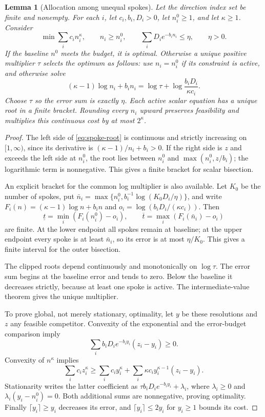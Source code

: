 \documentclass[11pt,letterpaper]{article}
\newtheorem{lemma}{Lemma}[section]
\theoremstyle{definition}
\theoremstyle{remark}
\begin{document}
\begin{lemma}[Allocation among unequal spokes]\label{thm:spokes}
Let the direction index set be finite and nonempty.
For each \(i\), let \(c_i,b_i,D_i>0\), let \(n_i^0\ge1\), and let \(\kappa\ge1\).
Consider
\[
 \min\sum_i c_i n_i^\kappa,\qquad
 n_i\ge n_i^0,\qquad \sum_iD_ie^{-b_in_i}\le\eta,\qquad\eta>0.
\]
If the baseline \(n^0\) meets the budget, it is optimal.
Otherwise a unique positive multiplier \(\tau\) selects the optimum as follows:
use \(n_i=n_i^0\) if its constraint is active, and otherwise solve
\begin{equation}\label{eq:spoke-root}
 (\kappa-1)\log n_i+b_in_i
       =\log\tau+\log\frac{b_iD_i}{\kappa c_i}.
\end{equation}
Choose \(\tau\) so the error sum is exactly \(\eta\).
Each active scalar equation has a unique root in a finite bracket.
Rounding every \(n_i\) upward preserves feasibility and multiplies this
continuous cost by at most \(2^\kappa\).
\end{lemma}
\begin{proof}
The left side of \eqref{eq:spoke-root} is continuous and strictly increasing
on \([1,\infty)\), since its derivative is
\((\kappa-1)/n_i+b_i>0\).
If the right side is \(z\) and exceeds the left side at \(n_i^0\), the root
lies between \(n_i^0\) and \(\max(n_i^0,z/b_i)\); the logarithmic term is
nonnegative. This gives a finite bracket for scalar bisection.

An explicit bracket for the common log multiplier is also available.
Let \(K_0\) be the number of spokes, put
\(\bar n_i=\max\{n_i^0,b_i^{-1}\log(K_0D_i/\eta)\}\), and write
\(F_i(n)=(\kappa-1)\log n+b_in\) and
\(o_i=\log(b_iD_i/(\kappa c_i))\). Then
\[
 \underline t=\min_i(F_i(n_i^0)-o_i),\qquad
 \overline t=\max_i(F_i(\bar n_i)-o_i)
\]
are finite. At the lower endpoint all spokes remain at baseline; at the upper
endpoint every spoke is at least \(\bar n_i\), so its error is at most
\(\eta/K_0\). This gives a finite interval for the outer bisection.

The clipped roots depend continuously and monotonically on \(\log\tau\).
The error sum begins at the baseline error and tends to zero.
Below the baseline it decreases strictly, because at least one spoke is active.
The intermediate-value theorem gives the unique multiplier.

To prove global, not merely stationary, optimality, let \(y\) be these
resolutions and \(z\) any feasible competitor.
Convexity of the exponential and the error-budget comparison imply
\[
 \sum_i b_iD_ie^{-b_iy_i}(z_i-y_i)\ge0.
\]
Convexity of \(n^\kappa\) implies
\[
 \sum_i c_i z_i^\kappa
 \ge\sum_i c_i y_i^\kappa+
          \sum_i\kappa c_i y_i^{\kappa-1}(z_i-y_i).
\]
Stationarity writes the latter coefficient as
\(\tau b_iD_ie^{-b_iy_i}+\lambda_i\), where
\(\lambda_i\ge0\) and \(\lambda_i(y_i-n_i^0)=0\).
Both additional sums are nonnegative, proving optimality.
Finally \(\lceil y_i\rceil\ge y_i\) decreases its error, and
\(\lceil y_i\rceil\le2y_i\) for \(y_i\ge1\) bounds its cost.
\end{proof}
\end{document}
